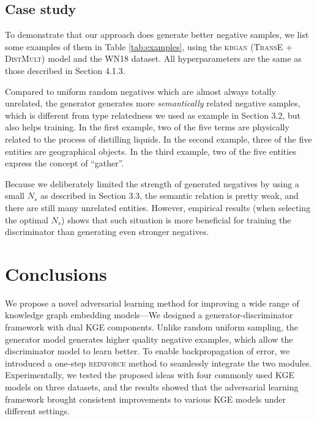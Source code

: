 \documentclass[11pt,a4paper]{article}
\begin{document}
\subsection{Case study}

To demonstrate that our approach does generate better negative samples, we list some examples of them in Table \ref{tab:examples}, using the \textsc{kbgan} (\textsc{TransE} + \textsc{DistMult}) model and the WN18 dataset. All hyperparameters are the same as those described in Section 4.1.3.

Compared to uniform random negatives which are almost always totally unrelated, the generator generates more \emph{semantically} related negative samples, which is different from type relatedness we used as example in Section 3.2, but also helps training. In the first example, two of the five terms are physically related to the process of distilling liquids. In the second example, three of the five entities are geographical objects. In the third example, two of the five entities express the concept of ``gather''.

Because we deliberately limited the strength of generated negatives by using a small $N_s$ as described in Section 3.3, the semantic relation is pretty weak, and there are still many unrelated entities. However, empirical results (when selecting the optimal $N_s$) shows that such situation is more beneficial for training the discriminator than generating even stronger negatives.

\section{Conclusions}
We propose a novel adversarial learning method for improving a wide range of knowledge graph embedding models---We designed a generator-discriminator framework with dual KGE components. Unlike random uniform sampling, the generator model generates higher quality negative examples, which allow the discriminator model to learn better. To enable backpropagation of error, we introduced a one-step \textsc{reinforce} method to seamlessly integrate the two modules. Experimentally, we tested the proposed ideas with four commonly used KGE models on three datasets, and the results showed that the adversarial learning framework brought consistent improvements to various KGE models under different settings.

\newpage


\end{document}
